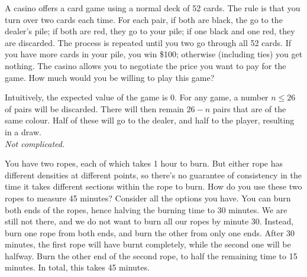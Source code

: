 \begin{qanda}
  \Q A casino offers a card game using a normal deck of 52 cards. The rule is that you turn over two cards each time.
  For each pair, if both are black, the go to the dealer's pile; if both are red, they go to your pile; if one black and one red, they are discarded. 
  The process is repeated until you two go through all 52 cards. 
  If you have more cards in your pile, you win \$100; otherwise (including ties) you get nothing. 
  The casino allows you to negotiate the price you want to pay for the game.
  How much would you be willing to play this game?

  \A 
  Intuitively, the expected value of the game is 0. For any game, a number $n \leq 26$ of pairs will be discarded. There will then remain $26 - n$ pairs that are of the same colour. Half of these will go to the dealer, and half to the player, resulting in a draw. \\
  \emph{Not complicated.}
\end{qanda}

\begin{qanda}
    \Q You have two ropes, each of which takes 1 hour to burn. But either rope has different densities at different points, so there's no guarantee of consistency in the time it takes different sections within the rope to burn. How do you use these two ropes to measure 45 minutes?
    \A 
    Consider all the options you have. You can burn both ends of the ropes, hence halving the burning time to 30 minutes.
    We are still not there, and we do not want to burn all our ropes by minute 30.
    Instead, burn one rope from both ends, and burn the other from only one ends.
    After 30 minutes, the first rope will have burnt completely, while the second one will be halfway. Burn the other end of the second rope, to half the remaining time to 15 minutes. 
    In total, this takes 45 minutes.
\end{qanda}

